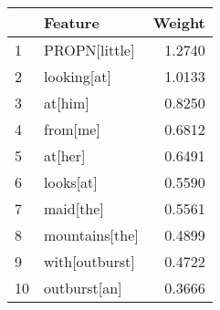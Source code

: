 \begin{tabular}{llr}
\toprule
{} &         Feature &  Weight \\
\midrule
1  &   PROPN[little] &  1.2740 \\
2  &     looking[at] &  1.0133 \\
3  &         at[him] &  0.8250 \\
4  &        from[me] &  0.6812 \\
5  &         at[her] &  0.6491 \\
6  &       looks[at] &  0.5590 \\
7  &       maid[the] &  0.5561 \\
8  &  mountains[the] &  0.4899 \\
9  &  with[outburst] &  0.4722 \\
10 &    outburst[an] &  0.3666 \\
\bottomrule
\end{tabular}
